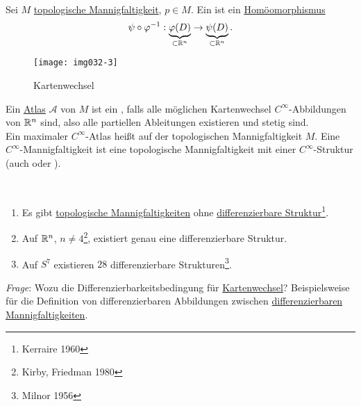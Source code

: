 \begin{definition}
  \ \\


  \begin{minipage}{.45\textwidth}
    Sei $ M $ \hyperref[def:topologischeMannigfaltigkeit]{topologische Mannigfaltigkeit}, $ p \in M $. Ein \label{def:kartenwechsel} ist ein \hyperref[def:homoeomorphismus]{Homöomorphismus}
    \begin{equation*}
      \psi \circ \varphi^{-1}: \underbrace{\varphi(D)}_{\subset \mathbb{R}^n} \to \underbrace{\psi(D)}_{\subset \mathbb{R}^n}\text{.}
    \end{equation*}
  \end{minipage}
  \hfill
  \begin{minipage}{.45\textwidth}
    \begin{figure}[H]
      \label{img032-3}
      \texttt{[image: img032-3]}
      \caption{Kartenwechsel}
    \end{figure}
  \end{minipage}
  Ein \hyperref[def:atlas]{Atlas} $ \mathcal{A} $ von $ M $ ist ein \label{def:dbatlas}, falls alle möglichen Kartenwechsel $ C^\infty $-Abbildungen von $ \mathbb{R}^n $ sind, also alle partiellen Ableitungen existieren und stetig sind. \\
  Ein maximaler $ C^\infty $-Atlas heißt \label{def:dbstruktur} auf der topologischen Mannigfaltigkeit $ M $. Eine $ C^\infty $-Mannigfaltigkeit ist eine topologische Mannigfaltigkeit mit einer $ C^\infty $-Struktur (auch \label{def:glattemannigfaltigkeit} oder \label{def:dbmannigfaltigkeit}).
\end{definition}

\begin{remark}
  \
  \begin{enumerate}
    \item Es gibt \hyperref[def:topologischeMannigfaltigkeit]{topologische Mannigfaltigkeiten} ohne \hyperref[def:dbstruktur]{differenzierbare Struktur}\footnote{Kerraire 1960}.
    \item Auf $ \mathbb{R}^n $, $ n \neq 4 $\footnote{Kirby, Friedman 1980}, existiert genau eine differenzierbare Struktur.
    \item Auf $ S^7 $ existieren $ 28 $ differenzierbare Strukturen\footnote{Milnor 1956}.
  \end{enumerate}
  \emph{Frage}: Wozu die Differenzierbarkeitsbedingung für \hyperref[def:kartenwechsel]{Kartenwechsel}? Beispielsweise für die Definition von differenzierbaren Abbildungen zwischen \hyperref[def:dbmannigfaltigkeit]{differenzierbaren Mannigfaltigkeiten}.
\end{remark}


